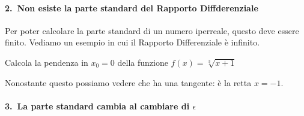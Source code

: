 \paragraph{2.~Non esiste la parte standard del Rapporto Diffderenziale}

Per poter calcolare la parte standard di un numero iperreale, questo 
deve essere finito. 
Vediamo un esempio in cui il Rapporto Differenziale è infinito.

\begin{esempio}
Calcola la pendenza in \(x_0 = 0\) della funzione \(f(x)=\sqrt[3]{x+1}\)

Nonostante questo possiamo vedere che ha una tangente: 
è la retta \(x=-1\).
\end{esempio}

\paragraph{3.~La parte standard cambia al cambiare di \(\epsilon\)}

